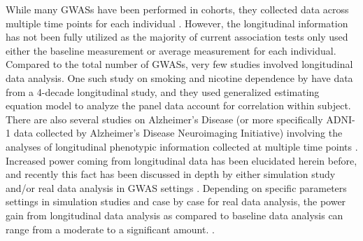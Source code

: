 \documentclass[12pt]{article}
\begin{document}
While many GWASs have been performed in cohorts, they collected data across multiple time points for each individual \cite{Aulchenko2009,Ionita-Laza2007,Kamatani2010,Kathiresan2007,Sabatti2008}. However, the longitudinal information has not been fully utilized as the majority of current association tests only used either the baseline measurement or average measurement for each individual\cite{Sabatti2008,Ionita-Laza2007,Kamatani2010,Kathiresan2007}. Compared to the total number of GWASs, very few studies involved longitudinal data analysis. One such study on smoking and nicotine dependence by \cite{Belsky2013} have data from a 4-decade longitudinal study, and they used generalized estimating equation model to analyze the panel data account for correlation within subject. There are also several studies on Alzheimer's Disease (or more specifically ADNI-1 data collected by Alzheimer's Disease Neuroimaging Initiative) involving the analyses of longitudinal phenotypic information collected at multiple time points \cite{Wang2012,Melville2012,Silver2012}. Increased power coming from longitudinal data has been elucidated herein before, and recently this fact has been discussed in depth by either simulation study and/or real data analysis in GWAS settings \cite{Xu2014,Furlotte2012}. Depending on specific parameters settings in simulation studies and case by case for real data analysis, the power gain from longitudinal data analysis as compared to baseline data analysis can range from a moderate to a significant amount. \cite{Xu2014,Furlotte2012}. 
\end{document}
